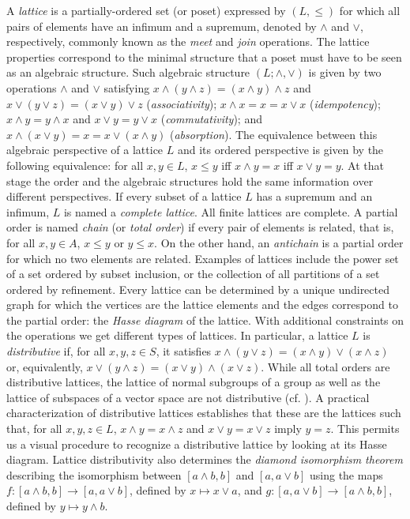\documentclass[10pt]{amsart}
\begin{document}
A \emph{lattice} is a partially-ordered set (or poset) expressed by $(L,\leq)$  for which all pairs of elements have an infimum and a supremum, denoted by $\wedge$ and $\vee$, respectively, commonly known as the \emph{meet} and \emph{join} operations. 
The lattice properties correspond to the minimal structure that a poset must have to be seen as an algebraic structure. 
Such algebraic structure $(L;\wedge ,\vee)$ is given by two operations $\wedge$ and $\vee$ satisfying $x\wedge (y\wedge z) = (x \wedge y)\wedge z$ and $x\vee (y\vee z) = (x \vee y)\vee z$ (\emph{associativity}); $x\wedge x = x = x\vee x$ (\emph{idempotency}); $x\wedge y=y\wedge x$ and $x\vee y=y\vee x$ (\emph{commutativity}); and $x\wedge (x\vee y)=x=x\vee (x\wedge y)$ (\emph{absorption}).
%
The equivalence between this algebraic perspective of a lattice $L$ and its ordered perspective is given by the following equivalence: for all $x,y\in L$, $x\leq y$ iff $x\wedge y=x$ iff $x\vee y=y$. 
At that stage the order and the algebraic structures hold the same information over different perspectives. 
If every subset of a lattice $L$ has a supremum and an infimum, $L$ is named a \emph{complete lattice}.
All finite lattices are complete. 
%
A partial order is named \emph{chain} (or \emph{total order}) if every pair of elements is related, that is, for all $x,y\in A$, $x\leq y$ or $y\leq x$. 
On the other hand, an \emph{antichain} is a partial order for which no two elements are related. 
%
Examples of lattices include the power set of a set ordered by subset inclusion, or the collection of all partitions of a set ordered by refinement.
%
Every lattice can be determined by a unique undirected graph for which the vertices are the lattice elements and the edges correspond to the partial order: the \emph{Hasse diagram} of the lattice. 
%
With additional constraints on the operations we get different types of lattices.  
In particular, a lattice $L$ is \emph{distributive} if, for all $x,y,z\in S$, it satisfies $x\wedge (y\vee z)=(x\wedge y)\vee (x\wedge z)$ or, equivalently, $x\vee (y\wedge z)=(x\vee y)\wedge (x\vee z)$.
While all total orders are distributive lattices, the lattice of normal subgroups of a group as well as the lattice of subspaces of a vector space are not distributive (cf. \cite{Ba40}).
A practical characterization of distributive lattices establishes that these are the lattices such that, for all $x,y,z\in L$, $x\wedge y=x\wedge z$ and $x\vee y=x\vee z$ imply 
$y=z$. This permits us a visual procedure to recognize a distributive lattice by looking at its Hasse diagram.
%
Lattice distributivity also determines the \emph{diamond isomorphism theorem} describing the isomorphism between $[a \wedge b, b]$ and $[a, a \vee b]$ using the maps $f: [a \wedge b, b] \rightarrow [a, a \vee b]$, defined by $x\mapsto x\vee a$, and $g:  [a, a\vee b]\rightarrow [a\wedge b,b]$, defined by $y\mapsto y\wedge b$. 
\end{document}
